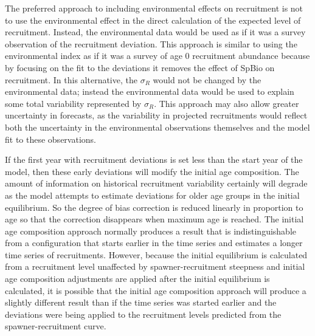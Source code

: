 The preferred approach to including environmental effects on recruitment is not to use the environmental effect in the direct calculation of the expected level of recruitment. Instead, the environmental data would be used as if it was a survey observation of the recruitment deviation. This approach is similar to using the environmental index as if it was a survey of age 0 recruitment abundance because by focusing on the fit to the deviations it removes the effect of SpBio on recruitment. In this alternative, the $\sigma_R$ would not be changed by the environmental data; instead the environmental data would be used to explain some total variability represented by $\sigma_R$. This approach may also allow greater uncertainty in forecasts, as the variability in projected recruitments would reflect both the uncertainty in the environmental observations themselves and the model fit to these observations.

If the first year with recruitment deviations is set less than the start year of the model, then these early deviations will modify the initial age composition. The amount of information on historical recruitment variability certainly will degrade as the model attempts to estimate deviations for older age groups in the initial equilibrium. So the degree of bias correction is reduced linearly in proportion to age so that the correction disappears when maximum age is reached. The initial age composition approach normally produces a result that is indistinguishable from a configuration that starts earlier in the time series and estimates a longer time series of recruitments. However, because the initial equilibrium is calculated from a recruitment level unaffected by spawner-recruitment steepness and initial age composition adjustments are applied after the initial equilibrium is calculated, it is possible that the initial age composition approach will produce a slightly different result than if the time series was started earlier and the deviations were being applied to the recruitment levels predicted from the spawner-recruitment curve. 
